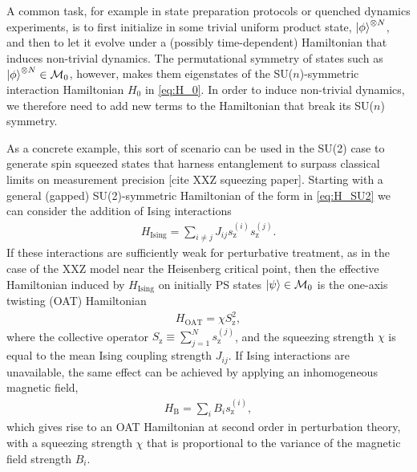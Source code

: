 \documentclass[nofootinbib,notitlepage,11pt]{revtex4-2}
\renewcommand{\t}{\text} %
\newcommand{\1}{\mathds{1}}
\newcommand{\z}{\text{z}}
\newcommand{\M}{\mathcal{M}}
\newcommand{\red}[1]{{\color{red} #1}}
\begin{document}
A common task, for example in state preparation protocols or quenched
dynamics experiments, is to first initialize in some trivial uniform
product state, $\ket\phi^{\otimes N}$, and then to let it evolve under
a (possibly time-dependent) Hamiltonian that induces non-trivial
dynamics.  The permutational symmetry of states such as
$\ket\phi^{\otimes N}\in\M_0$, however, makes them eigenstates of the
SU($n$)-symmetric interaction Hamiltonian $H_0$ in \eqref{eq:H_0}.  In
order to induce non-trivial dynamics, we therefore need to add new
terms to the Hamiltonian that break its SU($n$) symmetry.

As a concrete example, this sort of scenario can be used in the SU(2)
case to generate spin squeezed states that harness entanglement to
surpass classical limits on measurement
precision\cite{he2019engineering}\red{[cite XXZ squeezing paper]}.
Starting with a general (gapped) SU(2)-symmetric Hamiltonian of the
form in \eqref{eq:H_SU2} we can consider the addition of Ising
interactions
\begin{align}
  H_{\t{Ising}} = \sum_{i\ne j} J_{ij} s_\z^{(i)} s_\z^{(j)}.
  \label{eq:Ising}
\end{align}
If these interactions are sufficiently weak for perturbative
treatment, as in the case of the XXZ model near the Heisenberg
critical point, then the effective Hamiltonian induced by
$H_{\t{Ising}}$ on initially PS states $\ket\psi\in\M_0$ is the
one-axis twisting (OAT) Hamiltonian\cite{ma2011quantum}
\begin{align}
  H_{\t{OAT}} = \chi S_\z^2,
  \label{eq:OAT}
\end{align}
where the collective operator $S_\z\equiv\sum_{j=1}^Ns_\z^{(j)}$, and
the squeezing strength $\chi$ is equal to the mean Ising coupling
strength $J_{ij}$.  If Ising interactions are unavailable, the same
effect can be achieved by applying an inhomogeneous magnetic field,
\begin{align}
  H_{\t{B}} = \sum_i B_i s_\z^{(i)},
  \label{eq:magnetic}
\end{align}
which gives rise to an OAT Hamiltonian at second order in perturbation
theory, with a squeezing strength $\chi$ that is proportional to the
variance of the magnetic field strength $B_i$.
\end{document}

